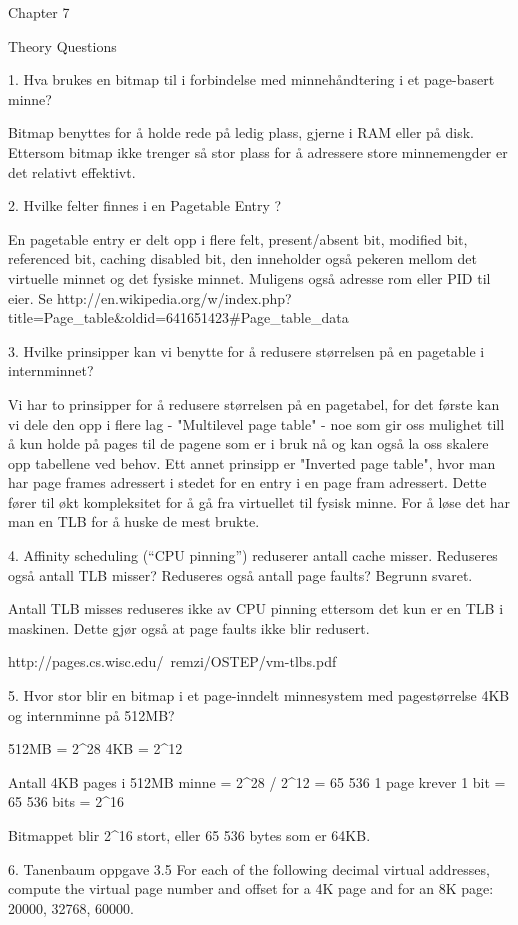 Chapter 7

Theory Questions

1. Hva brukes en bitmap til i forbindelse med minnehåndtering i et page-basert minne?

Bitmap benyttes for å holde rede på ledig plass, gjerne i RAM eller på disk. Ettersom bitmap ikke trenger så stor plass for å adressere store minnemengder er det relativt effektivt.

2. Hvilke felter finnes i en Pagetable Entry ?

En pagetable entry er delt opp i flere felt, present/absent bit, modified bit, referenced bit, caching disabled bit, den inneholder også pekeren mellom det virtuelle minnet og det fysiske minnet. Muligens også adresse rom eller PID til eier.
Se http://en.wikipedia.org/w/index.php?title=Page_table&oldid=641651423#Page_table_data

3.  Hvilke prinsipper kan vi benytte for å redusere størrelsen på en pagetable i internminnet?

Vi har to prinsipper for å redusere størrelsen på en pagetabel, for det første kan vi dele den opp i flere lag - "Multilevel page table" - noe som gir oss mulighet till å kun holde på pages til de pagene som er i bruk nå og kan også la oss skalere opp tabellene ved behov. Ett annet prinsipp er "Inverted page table", hvor man har page frames adressert i stedet for en entry i en page fram adressert. Dette fører til økt kompleksitet for å gå fra virtuellet til fysisk minne. For å løse det har man en TLB for å huske de mest brukte.

 4. Affinity scheduling (“CPU pinning”) reduserer antall cache misser. Reduseres også antall TLB misser? Reduseres også antall page faults? Begrunn svaret.

Antall TLB misses reduseres ikke av CPU pinning ettersom det kun er en TLB i maskinen. Dette gjør også at page faults ikke blir redusert.
 
http://pages.cs.wisc.edu/~remzi/OSTEP/vm-tlbs.pdf

5. Hvor stor blir en bitmap i et page-inndelt minnesystem med pagestørrelse 4KB og internminne på 512MB?

512MB = 2^28 
4KB   = 2^12 

Antall 4KB pages i 512MB minne = 2^28 / 2^12 = 65 536
1 page krever 1 bit = 65 536 bits = 2^16 

Bitmappet blir 2^16 stort, eller 65 536 bytes som er 64KB.

6. Tanenbaum oppgave 3.5
For each of the following decimal virtual addresses, compute the virtual page number and offset for a 4K page and for an 8K page: 20000, 32768, 60000. 


